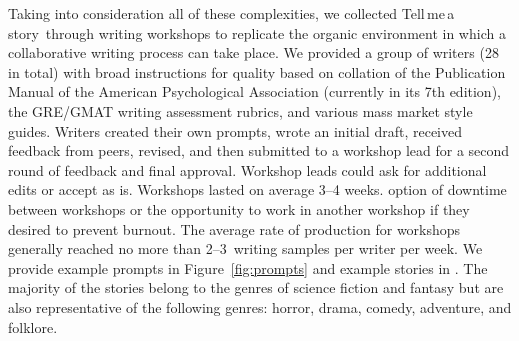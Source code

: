 \documentclass{article}
\newcommand{\tellmeastory}{{\sc Tell$\,$me$\,$a$\,$story}}
\begin{document}
Taking into consideration all of these complexities, we collected  \tellmeastory\ through writing workshops to replicate the organic environment in which a collaborative writing process can take place. We provided a group of writers (28 in total) with broad instructions for quality based on collation of the Publication Manual of the American Psychological Association (currently in its 7th edition), the GRE/GMAT writing assessment rubrics, and various mass market style guides. 
Writers created their own prompts, %
wrote an initial draft, received feedback from peers, revised, and
then submitted to a workshop lead for a second round of feedback and
final approval. Workshop leads could ask for additional edits or
accept as is. Workshops lasted on average 3--4 weeks. %
option of downtime between workshops or the opportunity to work in
another workshop if they desired to prevent burnout.  The average rate
of production for workshops generally reached no more than
\mbox{2--3}~writing samples per writer per week. We provide example prompts
in Figure~\ref{fig:prompts} and example stories in
. The majority of the stories belong to
the genres of science fiction and fantasy but are also representative
of the following genres: horror, drama, comedy, adventure, and
folklore.
\end{document}
